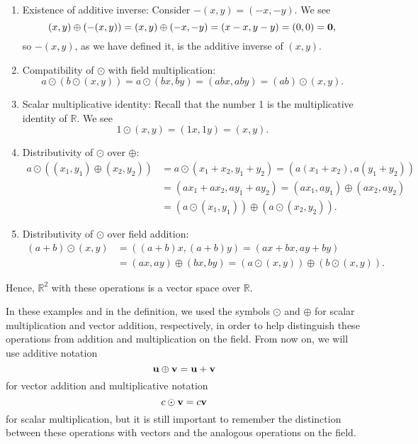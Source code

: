 \begin{sltn}
\begin{enumerate}
    \item Existence of additive inverse: Consider $ -(x,y)=(-x,-y) $. We see
    \begin{equation*}
        (x,y)\oplus(-(x,y))=(x,y)\oplus(-x,-y)=(x-x,y-y)=(0,0)=\boldsymbol{\mathbf{0}},
    \end{equation*}
    so $ -(x,y) $, as we have defined it, is the additive inverse of $ (x,y) $.

    \item Compatibility of $ \odot $ with field multiplication:
    \begin{equation*}
        a\odot(b\odot(x,y))=a\odot(bx,by)=(abx,aby)=(ab)\odot(x,y).
    \end{equation*}

    \item Scalar multiplicative identity: Recall that the number 1 is the multiplicative identity of $ \mathbb{R} $. We see
    \begin{equation*}
        1\odot(x,y)=(1x,1y)=(x,y).
    \end{equation*}

    \item Distributivity of $ \odot $ over $ \oplus $:
    \begin{align*}
        a\odot((x_1,y_1)\oplus(x_2,y_2)) &= a\odot(x_1\!+x_2,y_1+y_2)=(a(x_1\!+x_2),a(y_1+y_2)) \\
        &= (ax_1\!+ax_2,ay_1+ay_2)=(ax_1,ay_1)\oplus(ax_2,ay_2) \\
        &= (a\odot(x_1,y_1))\oplus(a\odot(x_2,y_2)).
    \end{align*}

    \item Distributivity of $ \odot $ over field addition:
    \begin{align*}
        (a+b)\odot(x,y) &= ((a+b)x,(a+b)y)=(ax+bx,ay+by) \\
        &= (ax,ay)\oplus(bx,by)=(a\odot(x,y))\oplus(b\odot(x,y)).
    \end{align*}
\end{enumerate}
Hence, $ \mathbb{R}^2 $ with these operations is a vector space over $ \mathbb{R} $.
\end{sltn}

In these examples and in the definition, we used the symbols $ \odot $ and $ \oplus $ for scalar multiplication and vector addition, respectively, in order to help distinguish these operations from addition and multiplication on the field. From now on, we will use additive notation
\begin{equation*}
    \boldsymbol{\mathbf{u}}\oplus\boldsymbol{\mathbf{v}}=\boldsymbol{\mathbf{u}}+\boldsymbol{\mathbf{v}}
\end{equation*}
for vector addition and multiplicative notation
\begin{equation*}
    c\odot\boldsymbol{\mathbf{v}}=c\boldsymbol{\mathbf{v}}
\end{equation*}
for scalar multiplication, but it is still important to remember the distinction between these operations with vectors and the analogous operations on the field.

